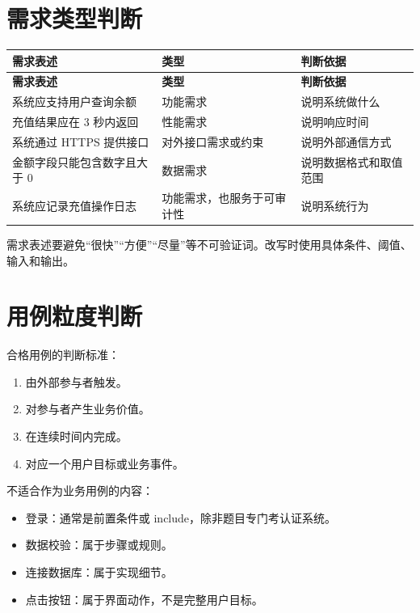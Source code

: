 \documentclass[UTF8,zihao=-4]{ctexart}
\begin{document}
\section{需求类型判断}

{
\footnotesize
\begin{longtable}{|>{\raggedright\arraybackslash}p{}|>{\raggedright\arraybackslash}p{}|>{\raggedright\arraybackslash}p{}|}
\hline
\textbf{需求表述} & \textbf{类型} & \textbf{判断依据} \\
\hline
\endfirsthead
\hline
\textbf{需求表述} & \textbf{类型} & \textbf{判断依据} \\
\hline
\endhead
系统应支持用户查询余额 & 功能需求 & 说明系统做什么 \\
\hline
充值结果应在 3 秒内返回 & 性能需求 & 说明响应时间 \\
\hline
系统通过 HTTPS 提供接口 & 对外接口需求或约束 & 说明外部通信方式 \\
\hline
金额字段只能包含数字且大于 0 & 数据需求 & 说明数据格式和取值范围 \\
\hline
系统应记录充值操作日志 & 功能需求，也服务于可审计性 & 说明系统行为 \\
\hline
\end{longtable}
}


需求表述要避免“很快”“方便”“尽量”等不可验证词。改写时使用具体条件、阈值、输入和输出。

\section{用例粒度判断}

合格用例的判断标准：

\begin{enumerate}
\item 由外部参与者触发。
\item 对参与者产生业务价值。
\item 在连续时间内完成。
\item 对应一个用户目标或业务事件。
\end{enumerate}

不适合作为业务用例的内容：

\begin{itemize}
\item 登录：通常是前置条件或 include，除非题目专门考认证系统。
\item 数据校验：属于步骤或规则。
\item 连接数据库：属于实现细节。
\item 点击按钮：属于界面动作，不是完整用户目标。
\end{itemize}
\end{document}
